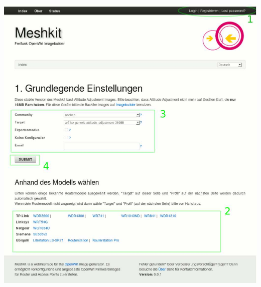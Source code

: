 \documentclass[a4paper,12pt,ngerman]{sphinxmanual}
\begin{document}
\includegraphics{basic-settings.jpg}
\end{document}
